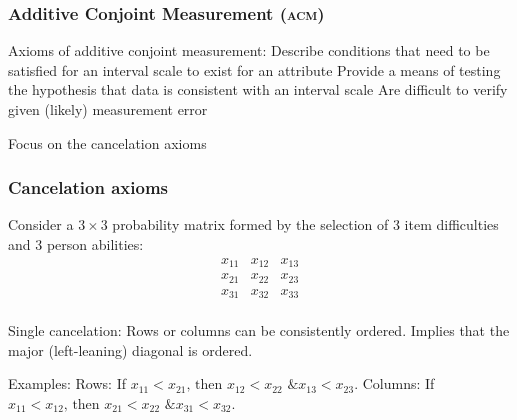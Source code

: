 \documentclass[10pt,serif,professionalfont]{beamer}
\begin{document}
\begin{frame}
    \frametitle{Additive Conjoint Measurement (\textsc{acm})}


    \begin{outline}
        \1 Axioms of additive conjoint measurement: 
            \2 Describe conditions that need to be satisfied for an interval scale to exist for an attribute
            \2 Provide a means of testing the hypothesis that data is consistent with an interval scale  
            \2 Are difficult to verify given (likely) measurement error  
            
        \vspace{0.25cm}
        
        \1 Focus on the cancelation axioms
    \end{outline}

\end{frame}

\begin{frame} 
    \frametitle{Cancelation axioms}
    
    Consider a $3 \times 3$ probability matrix formed by the selection of 3 item difficulties and 3 person abilities:
    \[
    \begin{array}{ccc}
      x_{11} & x_{12} & x_{13}  \\
      x_{21} & x_{22} & x_{23} \\
      x_{31} & x_{32} & x_{33} \\
    \end{array}
    \]
    
    \begin{outline}
        \1 Single cancelation: Rows or columns can be consistently ordered.  
            \2 Implies that the major (left-leaning) diagonal is ordered.  
    
        \vspace{0.1cm}
    
        \1 Examples: 
            \2 Rows: If $x_{11}<x_{21} \text{, then } x_{12}<x_{22} \text{ \& } x_{13}<x_{23}$.
            \2 Columns: If $x_{11}<x_{12} \text{, then } x_{21}<x_{22} \text{ \& } x_{31}<x_{32}$.
    \end{outline}

\end{frame}
\end{document}
